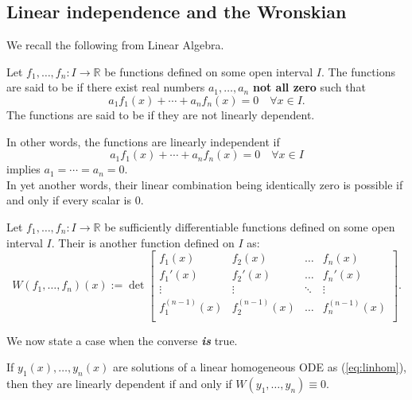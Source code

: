 \subsection{Linear independence and the Wronskian}
We recall the following from Linear Algebra.
\begin{defn}
	Let $f_1, \ldots, f_n:I \to \mathbb{R}$ be functions defined on some open interval $I.$ The functions are said to be  if there exist real numbers $a_1, \ldots, a_n$ \textbf{not all zero} such that
	\[a_1f_1(x) + \cdots + a_nf_n(x) = 0 \quad \forall x \in I.\]
	The functions are said to be  if they are not linearly dependent.
\end{defn}
\begin{mdframed}[style=boxstyle, frametitle={A rephrasing}]
	In other words, the functions are linearly independent if
	\[a_1f_1(x) + \cdots + a_nf_n(x) = 0 \quad \forall x \in I\]
	implies $a_1 = \cdots = a_n = 0.$\\
	In yet another words, their linear combination being identically zero is possible if and only if every scalar is $0.$
\end{mdframed}
\begin{defn}[Wronskian]
	Let $f_1, \ldots, f_n:I \to \mathbb{R}$ be sufficiently differentiable functions defined on some open interval $I.$ Their  is another function defined on $I$ as:
	\[W(f_1, \ldots, f_n)(x) := \det\begin{bmatrix}
		f_1(x) & f_2(x) & \ldots & f_n(x)\\
		f_1'(x) & f_2'(x) & \ldots & f_n'(x)\\
		\vdots & \vdots & \ddots & \vdots\\
		f_1^{(n-1)}(x) & f_2^{(n-1)}(x) & \ldots & f_n^{(n-1)}(x)\\
	\end{bmatrix}.\]
\end{defn}
We now state a case when the converse \emph{\textbf{is}} true.
\begin{thm} 
	If $y_1(x), \ldots, y_n(x)$ are solutions of a linear homogeneous ODE as (\ref{eq:linhom}), then they are linearly dependent if and only if $W(y_1, \ldots, y_n) \equiv 0.$
\end{thm}
